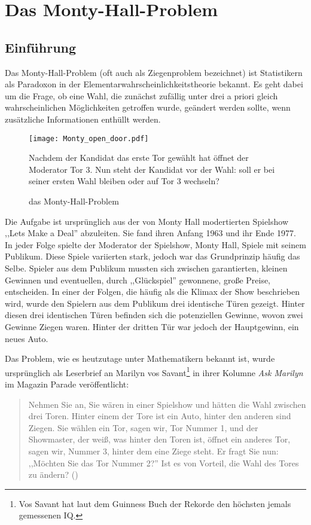 
\chapter{Das Monty-Hall-Problem}

\section{Einführung}

Das Monty-Hall-Problem (oft auch als Ziegenproblem bezeichnet) ist Statistikern als Paradoxon in der Elementarwahrscheinlichkeitstheorie bekannt.
Es geht dabei um die Frage, ob eine Wahl, die zunächst zufällig unter drei a priori gleich wahrscheinlichen Möglichkeiten getroffen wurde, geändert werden sollte, wenn zusätzliche Informationen enthüllt werden.
\begin{wrapfigure}{r}{0.3\textwidth}
    \centering
    \captionsetup{name=Abb., justification=centering, format=nolinebreak}
    \texttt{[image: Monty\_open\_door.pdf]}
    \caption{das Monty-Hall-Problem} \label{fig:monty-hall}
    \small Nachdem der Kandidat das erste Tor gewählt hat öffnet der Moderator Tor 3. Nun steht der Kandidat vor der Wahl: soll er bei seiner ersten Wahl bleiben oder auf Tor 3 wechseln?
\end{wrapfigure}
Die Aufgabe ist ursprünglich aus der von Monty Hall modertierten Spielshow ,,Lets Make a Deal'' abzuleiten. Sie fand ihren Anfang
1963 und ihr Ende 1977. In jeder Folge spielte der Moderator der Spielshow, Monty Hall, Spiele mit seinem Publikum. Diese Spiele variierten stark, jedoch war das Grundprinzip
häufig das Selbe. Spieler aus dem Publikum mussten sich zwischen garantierten, kleinen Gewinnen und eventuellen, durch ,,Glückspiel'' gewonnene, große Preise, entscheiden.
In einer der Folgen, die häufig als die Klimax der Show beschrieben wird, wurde den Spielern aus dem Publikum drei identische Türen gezeigt. Hinter diesen drei
identischen Türen befinden sich die potenziellen Gewinne, wovon zwei Gewinne Ziegen waren. Hinter der dritten Tür war jedoch der Hauptgewinn, ein neues Auto.

Das Problem, wie es heutzutage unter Mathematikern bekannt ist, wurde ursprünglich als Leserbrief an Marilyn vos Savant\footnote{Vos Savant hat laut dem Guinness Buch der Rekorde den höchsten jemals gemessenen IQ.} in ihrer Kolumne \textit{Ask Marilyn} im Magazin Parade veröffentlicht:

\begin{quote}
    Nehmen Sie an, Sie wären in einer Spielshow und hätten die Wahl zwischen drei Toren. Hinter einem der Tore ist ein Auto, hinter den anderen sind Ziegen. Sie wählen ein Tor, sagen wir, Tor Nummer 1, und der Showmaster, der weiß, was hinter den Toren ist, öffnet ein anderes Tor, sagen wir, Nummer 3, hinter dem eine Ziege steht. Er fragt Sie nun: ,,Möchten Sie das Tor Nummer 2?'' Ist es von Vorteil, die Wahl des Tores zu ändern? (\cite{Savant:1990})
\end{quote}

